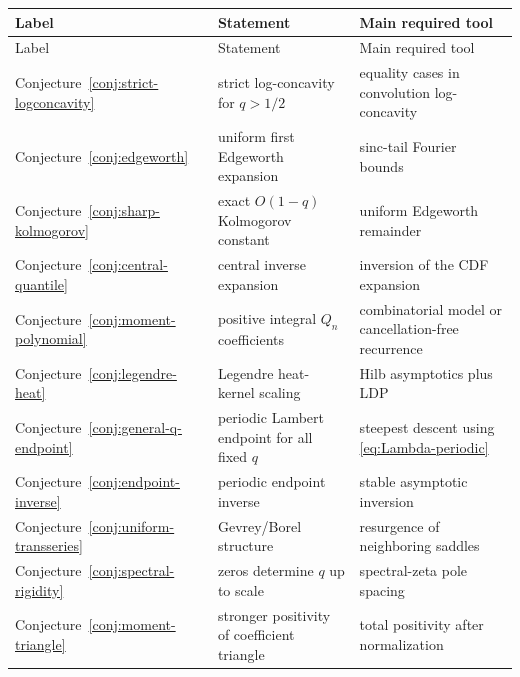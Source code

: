 \documentclass[11pt,oneside]{article}
\theoremstyle{definition}
\theoremstyle{remark}
\begin{document}
{\small
\begin{longtable}{>{\raggedright\arraybackslash}p{}>{\raggedright\arraybackslash}p{}>{\raggedright\arraybackslash}p{}}
\toprule
Label & Statement & Main required tool\\
\midrule
\endfirsthead
\toprule
Label & Statement & Main required tool\\
\midrule
\endhead
Conjecture~\ref{conj:strict-logconcavity} & strict log-concavity for $q>1/2$ & equality cases in convolution log-concavity\\
Conjecture~\ref{conj:edgeworth} & uniform first Edgeworth expansion & sinc-tail Fourier bounds\\
Conjecture~\ref{conj:sharp-kolmogorov} & exact $O(1-q)$ Kolmogorov constant & uniform Edgeworth remainder\\
Conjecture~\ref{conj:central-quantile} & central inverse expansion & inversion of the CDF expansion\\
Conjecture~\ref{conj:moment-polynomial} & positive integral $Q_n$ coefficients & combinatorial model or cancellation-free recurrence\\
Conjecture~\ref{conj:legendre-heat} & Legendre heat-kernel scaling & Hilb asymptotics plus LDP\\
Conjecture~\ref{conj:general-q-endpoint} & periodic Lambert endpoint for all fixed $q$ & steepest descent using \cref{eq:Lambda-periodic}\\
Conjecture~\ref{conj:endpoint-inverse} & periodic endpoint inverse & stable asymptotic inversion\\
Conjecture~\ref{conj:uniform-transseries} & Gevrey/Borel structure & resurgence of neighboring saddles\\
Conjecture~\ref{conj:spectral-rigidity} & zeros determine $q$ up to scale & spectral-zeta pole spacing\\
Conjecture~\ref{conj:moment-triangle} & stronger positivity of coefficient triangle & total positivity after normalization\\
\bottomrule
\end{longtable}
}
\end{document}
